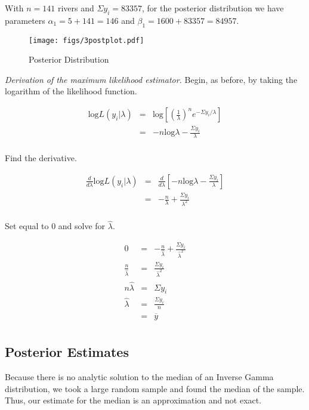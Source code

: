 \documentclass[12pt]{article}
\newcommand{\ybar}{\overline{y}}
\begin{document}
\noindent With $n=141$ rivers and $\Sigma y_i=83357$, for the posterior distribution we have parameters $\alpha_1=5+141=146$ and $\beta_1=1600+83357=84957$.

\begin{figure}[H]
\begin{center}
\texttt{[image: figs/3postplot.pdf]}
\caption{Posterior Distribution}
\end{center}
\end{figure}

\noindent \textit{Derivation of the maximum likelihood estimator.}  Begin, as before, by taking the logarithm of the likelihood function.

\begin{eqnarray*}
\mathrm{log}L(y_i|\lambda) &=& \mathrm{log}\left[\left(\frac{1}{\lambda}\right)^ne^{-\Sigma y_i/\lambda}\right] \\
&=& -n\mathrm{log}\lambda-\frac{\Sigma y_i}{\lambda} \\
\end{eqnarray*}

\noindent Find the derivative.

\begin{eqnarray*}
\frac{d}{d\lambda}\mathrm{log}L(y_i|\lambda) &=& \frac{d}{d\lambda}\left[-n\mathrm{log}\lambda-\frac{\Sigma y_i}{\lambda}\right] \\
&=& -\frac{n}{\lambda}+\frac{\Sigma y_i}{\lambda^2} \\
\end{eqnarray*}

\noindent Set equal to 0 and solve for $\hat{\lambda}$.

\begin{eqnarray*}
0 &=& -\frac{n}{\hat{\lambda}}+\frac{\Sigma y_i}{\hat{\lambda}^2} \\
\frac{n}{\hat{\lambda}} &=& \frac{\Sigma y_i}{\hat{\lambda}^2} \\
n\hat{\lambda} &=& \Sigma y_i \\
\hat{\lambda} &=& \frac{\Sigma y_i}{n} \\
&=& \ybar \\
\end{eqnarray*}

\subsection{Posterior Estimates}

\noindent Because there is no analytic solution to the median of an Inverse Gamma distribution, we took a large random sample and found the median of the sample.  Thus, our estimate for the median is an approximation and not exact.
\end{document}
